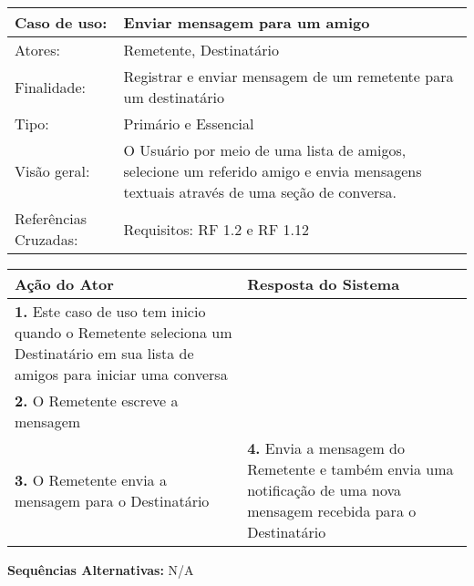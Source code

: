 \documentclass[12pt,a4paper,onecolumn,titlepage]{article}
\begin{document}
\begin{table}[h!]
\begin{center}
\begin{tabular}{p{2.5cm} p{9.5cm}}
Caso de uso: & \textbf{Enviar mensagem para um amigo} \\ \hline
Atores: & Remetente, Destinatário \\ \hline
Finalidade: & Registrar e enviar mensagem de um remetente para um destinatário\\ \hline
Tipo: & Primário e Essencial \\ \hline
Visão geral: & O Usuário por meio de uma lista de amigos, selecione um referido amigo e envia mensagens textuais através de uma seção de conversa. \\ \hline
Referências Cruzadas: & Requisitos: RF 1.2 e RF 1.12\\

\end{tabular}
\end{center}
\end{table} 

\begin{center}
\def\arraystretch{1.1}
\begin{tabular}{|p{6cm}|p{6cm}|}

\hline
\textbf{Ação do Ator} & \textbf{Resposta do Sistema} \\ \hline
\textbf{1.} Este caso de uso tem inicio quando o Remetente seleciona um Destinatário em sua lista de amigos para iniciar uma conversa  &  \\ \hline
\textbf{2.} O Remetente escreve a mensagem  &   \\ \hline
\textbf{3.} O Remetente envia a mensagem para o Destinatário  &
\textbf{4.} Envia a mensagem do Remetente e também envia uma notificação de uma nova mensagem recebida para o Destinatário \\ \hline
\end{tabular}
\end{center}

\textbf{Sequências Alternativas:} N/A

\newpage
\end{document}
